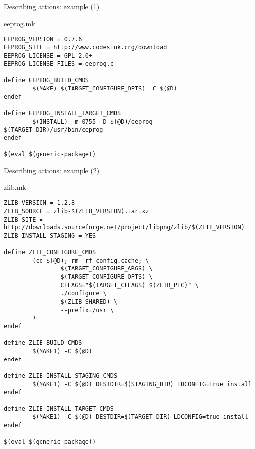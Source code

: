 \begin{frame}[fragile]{Describing actions: example (1)}
  \begin{block}{eeprog.mk}
    \begin{verbatim}
EEPROG_VERSION = 0.7.6
EEPROG_SITE = http://www.codesink.org/download
EEPROG_LICENSE = GPL-2.0+
EEPROG_LICENSE_FILES = eeprog.c

define EEPROG_BUILD_CMDS
        $(MAKE) $(TARGET_CONFIGURE_OPTS) -C $(@D)
endef

define EEPROG_INSTALL_TARGET_CMDS
        $(INSTALL) -m 0755 -D $(@D)/eeprog $(TARGET_DIR)/usr/bin/eeprog
endef

$(eval $(generic-package))
    \end{verbatim}
  \end{block}
\end{frame}

\begin{frame}[fragile]{Describing actions: example (2)}
  \begin{block}{zlib.mk}
    \begin{verbatim}
ZLIB_VERSION = 1.2.8
ZLIB_SOURCE = zlib-$(ZLIB_VERSION).tar.xz
ZLIB_SITE = http://downloads.sourceforge.net/project/libpng/zlib/$(ZLIB_VERSION)
ZLIB_INSTALL_STAGING = YES

define ZLIB_CONFIGURE_CMDS
        (cd $(@D); rm -rf config.cache; \
                $(TARGET_CONFIGURE_ARGS) \
                $(TARGET_CONFIGURE_OPTS) \
                CFLAGS="$(TARGET_CFLAGS) $(ZLIB_PIC)" \
                ./configure \
                $(ZLIB_SHARED) \
                --prefix=/usr \
        )
endef

define ZLIB_BUILD_CMDS
        $(MAKE1) -C $(@D)
endef

define ZLIB_INSTALL_STAGING_CMDS
        $(MAKE1) -C $(@D) DESTDIR=$(STAGING_DIR) LDCONFIG=true install
endef

define ZLIB_INSTALL_TARGET_CMDS
        $(MAKE1) -C $(@D) DESTDIR=$(TARGET_DIR) LDCONFIG=true install
endef

$(eval $(generic-package))
    \end{verbatim}
  \end{block}
\end{frame}

